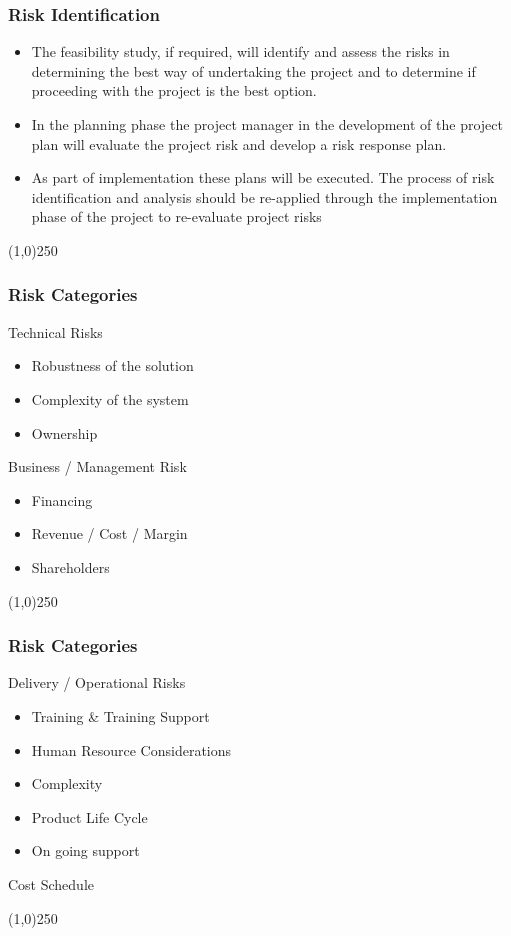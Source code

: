 \begin{frame}
\frametitle{Risk Identification}
\begin{itemize}
\item The feasibility study, if required, will identify and assess the risks in determining the best way of undertaking the project and to determine if proceeding with the project is the best option.
\item In the planning phase the project manager in the development of the project plan will evaluate the project risk and develop a risk response plan.
\item As part of implementation these plans will be executed. The process of risk identification and analysis should be re-applied through the implementation phase of the project to re-evaluate project risks
\end{itemize}
\end{frame}\begin{center}\line(1,0){250}\end{center}






\begin{frame}
\frametitle{Risk Categories}
Technical Risks
\begin{itemize}
	\item Robustness of the solution
	\item Complexity of the system
	\item Ownership
\end{itemize}
Business / Management Risk
\begin{itemize}
	\item Financing
	\item Revenue / Cost / Margin
	\item Shareholders
\end{itemize}
\end{frame}\begin{center}\line(1,0){250}\end{center}


\begin{frame}
\frametitle{Risk Categories}
Delivery / Operational Risks
\begin{itemize}
	\item Training \& Training Support
	\item Human Resource Considerations
	\item Complexity
	\item Product Life Cycle
	\item On going support
\end{itemize}
Cost
Schedule
\end{frame}\begin{center}\line(1,0){250}\end{center}



